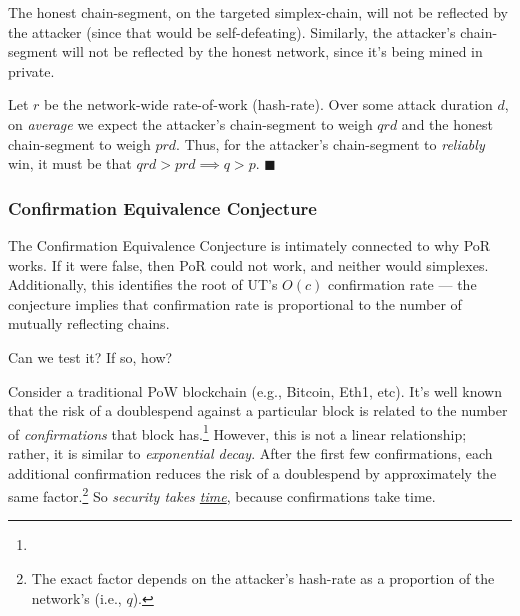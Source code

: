 The honest chain-segment, on the targeted simplex-chain, will not be reflected by the attacker (since that would be self-defeating).
Similarly, the attacker's chain-segment will not be reflected by the honest network, since it's being mined in private.

Let $r$ be the network-wide rate-of-work (hash-rate).
Over some attack duration $d$, on \emph{average} we expect the attacker's chain-segment to weigh $qrd$ and the honest chain-segment to weigh $prd$.
Thus, for the attacker's chain-segment to \emph{reliably} win, it must be that $qrd > prd \implies q > p$.
$\blacksquare$

\subsubsection{Confirmation Equivalence Conjecture}

\label{sec:cec-overview}


The Confirmation Equivalence Conjecture is intimately connected to why PoR works.
If it were false, then PoR could not work, and neither would simplexes.
Additionally, this identifies the root of UT's $O(c)$ confirmation rate --- the conjecture implies that confirmation rate is proportional to the number of mutually reflecting chains.

Can we test it? If so, how?

Consider a traditional PoW blockchain (e.g., Bitcoin, Eth1, etc).
It's well known that the risk of a doublespend against a particular block is related to the number of \emph{confirmations} that block has.\footnote{
  \citeAHBDS{}
}
However, this is not a linear relationship; rather, it is similar to \emph{exponential decay}.
After the first few confirmations, each additional confirmation reduces the risk of a doublespend by approximately the same factor.\footnote{
    The exact factor depends on the attacker's hash-rate as a proportion of the network's (i.e., $q$).
}
So \emph{security takes \ul{time}}, because confirmations take time.

